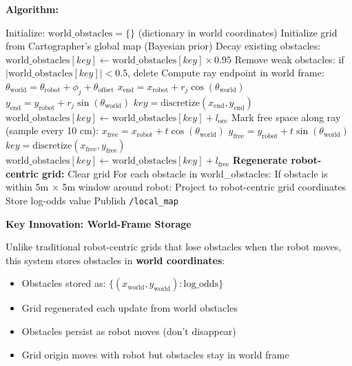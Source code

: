 \documentclass[11pt]{article}
\begin{document}
\textbf{Algorithm:}

\begin{algorithm}[H]
\caption{Fast Local Grid with World-Frame Storage}
\begin{algorithmic}[1]
\State Initialize: $\text{world\_obstacles} = \{\}$ (dictionary in world coordinates)
\State Initialize grid from Cartographer's global map (Bayesian prior)
    \State Decay existing obstacles: $\text{world\_obstacles}[key] \gets \text{world\_obstacles}[key] \times 0.95$
    \State Remove weak obstacles: if $|\text{world\_obstacles}[key]| < 0.5$, delete
        \State Compute ray endpoint in world frame:
            \State $\theta_{\text{world}} = \theta_{\text{robot}} + \phi_j + \theta_{\text{offset}}$
            \State $x_{\text{end}} = x_{\text{robot}} + r_j \cos(\theta_{\text{world}})$
            \State $y_{\text{end}} = y_{\text{robot}} + r_j \sin(\theta_{\text{world}})$
         
            \State $key = \text{discretize}(x_{\text{end}}, y_{\text{end}})$
            \State $\text{world\_obstacles}[key] \gets \text{world\_obstacles}[key] + l_{\text{occ}}$
        \EndIf
        \State Mark free space along ray (sample every 10 cm):
                \State $x_{\text{free}} = x_{\text{robot}} + t \cos(\theta_{\text{world}})$
                \State $y_{\text{free}} = y_{\text{robot}} + t \sin(\theta_{\text{world}})$
                \State $key = \text{discretize}(x_{\text{free}}, y_{\text{free}})$
                \State $\text{world\_obstacles}[key] \gets \text{world\_obstacles}[key] + l_{\text{free}}$
            \EndFor
    \EndFor
    \State \textbf{Regenerate robot-centric grid:}
        \State Clear grid
        \State For each obstacle in world\_obstacles:
            \State If obstacle is within 5m $\times$ 5m window around robot:
                \State Project to robot-centric grid coordinates
                \State Store log-odds value
    \State Publish \texttt{/local\_map}
\EndLoop
\end{algorithmic}
\end{algorithm}

\textbf{Key Innovation: World-Frame Storage}

Unlike traditional robot-centric grids that lose obstacles when the robot moves, this system stores obstacles in \textbf{world coordinates}:

\begin{itemize}
    \item Obstacles stored as: $\{(x_{\text{world}}, y_{\text{world}}): \text{log\_odds}\}$
    \item Grid regenerated each update from world obstacles
    \item Obstacles persist as robot moves (don't disappear)
    \item Grid origin moves with robot but obstacles stay in world frame
\end{itemize}
\end{document}
